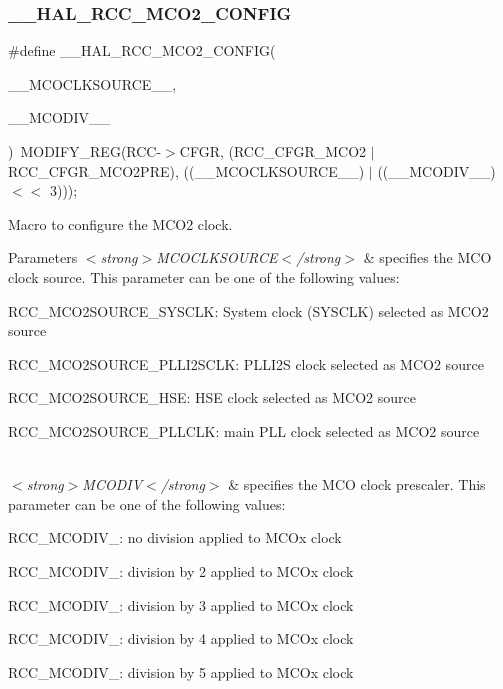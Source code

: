 \subsubsection{\texorpdfstring{\_\_HAL\_RCC\_MCO2\_CONFIG}{\_\_HAL\_RCC\_MCO2\_CONFIG}}
{\footnotesize\ttfamily \#define \+\_\+\+\_\+\+H\+A\+L\+\_\+\+R\+C\+C\+\_\+\+M\+C\+O2\+\_\+\+C\+O\+N\+F\+IG(\begin{DoxyParamCaption}\item[{}]{\+\_\+\+\_\+\+M\+C\+O\+C\+L\+K\+S\+O\+U\+R\+C\+E\+\_\+\+\_\+,  }\item[{}]{\+\_\+\+\_\+\+M\+C\+O\+D\+I\+V\+\_\+\+\_\+ }\end{DoxyParamCaption})~M\+O\+D\+I\+F\+Y\+\_\+\+R\+EG(R\+CC-\/$>$C\+F\+GR, (R\+C\+C\+\_\+\+C\+F\+G\+R\+\_\+\+M\+C\+O2 $\vert$ R\+C\+C\+\_\+\+C\+F\+G\+R\+\_\+\+M\+C\+O2\+P\+RE), ((\+\_\+\+\_\+\+M\+C\+O\+C\+L\+K\+S\+O\+U\+R\+C\+E\+\_\+\+\_\+) $\vert$ ((\+\_\+\+\_\+\+M\+C\+O\+D\+I\+V\+\_\+\+\_\+) $<$$<$ 3)));}



Macro to configure the M\+C\+O2 clock. 


\begin{DoxyParams}{Parameters}
{\em $<$strong$>$\+M\+C\+O\+C\+L\+K\+S\+O\+U\+R\+C\+E$<$/strong$>$} & specifies the M\+CO clock source. This parameter can be one of the following values\+: \begin{DoxyItemize}
\item R\+C\+C\+\_\+\+M\+C\+O2\+S\+O\+U\+R\+C\+E\+\_\+\+S\+Y\+S\+C\+LK\+: System clock (S\+Y\+S\+C\+LK) selected as M\+C\+O2 source \item R\+C\+C\+\_\+\+M\+C\+O2\+S\+O\+U\+R\+C\+E\+\_\+\+P\+L\+L\+I2\+S\+C\+LK\+: P\+L\+L\+I2S clock selected as M\+C\+O2 source \item R\+C\+C\+\_\+\+M\+C\+O2\+S\+O\+U\+R\+C\+E\+\_\+\+H\+SE\+: H\+SE clock selected as M\+C\+O2 source \item R\+C\+C\+\_\+\+M\+C\+O2\+S\+O\+U\+R\+C\+E\+\_\+\+P\+L\+L\+C\+LK\+: main P\+LL clock selected as M\+C\+O2 source \end{DoxyItemize}
\\
\hline
{\em $<$strong$>$\+M\+C\+O\+D\+I\+V$<$/strong$>$} & specifies the M\+CO clock prescaler. This parameter can be one of the following values\+: \begin{DoxyItemize}
\item R\+C\+C\+\_\+\+M\+C\+O\+D\+I\+V\+\_\+: no division applied to M\+C\+Ox clock \item R\+C\+C\+\_\+\+M\+C\+O\+D\+I\+V\+\_\+: division by 2 applied to M\+C\+Ox clock \item R\+C\+C\+\_\+\+M\+C\+O\+D\+I\+V\+\_\+: division by 3 applied to M\+C\+Ox clock \item R\+C\+C\+\_\+\+M\+C\+O\+D\+I\+V\+\_\+: division by 4 applied to M\+C\+Ox clock \item R\+C\+C\+\_\+\+M\+C\+O\+D\+I\+V\+\_\+: division by 5 applied to M\+C\+Ox clock \end{DoxyItemize}
\\
\hline
\end{DoxyParams}
